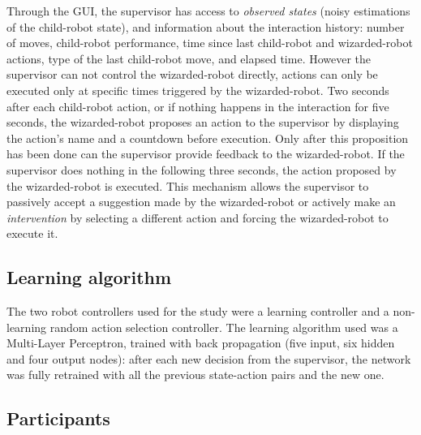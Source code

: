 Through the GUI, the supervisor has access to \textit{observed states} (noisy estimations of the child-robot state), and information about the interaction history: number of moves, child-robot performance, time since last child-robot and wizarded-robot actions, type of the last child-robot move, and elapsed time.
However the supervisor can not control the wizarded-robot directly, actions can only be executed only at specific times triggered by the wizarded-robot. 
Two seconds after each child-robot action, or if nothing happens in the interaction for five seconds, the wizarded-robot proposes an action to the supervisor by displaying the action's name and a countdown before execution. 
Only after this proposition has been done can the supervisor provide feedback to the wizarded-robot.
If the supervisor does nothing in the following three seconds, the action proposed by the wizarded-robot is executed.
This mechanism allows the supervisor to passively accept a suggestion made by the wizarded-robot or actively make an \emph{intervention} by selecting a different action and forcing the wizarded-robot to execute it.

\subsection{Learning algorithm}

The two robot controllers used for the study were a learning controller and a non-learning random action selection controller.
The learning algorithm used was a Multi-Layer Perceptron, 
trained with back propagation (five input, six hidden and four output nodes): after each new decision from the supervisor, the network was fully retrained with all the previous state-action pairs and the new one.

\subsection{Participants}

